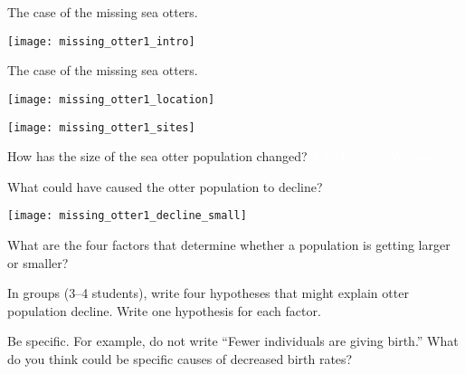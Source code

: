 \documentclass[t]{beamer}
\begin{document}
\begin{frame}{The case of the missing sea otters.}

	\centering\texttt{[image: missing\_otter1\_intro]}
	
\end{frame}
%
{
\begin{frame}[t]{The case of the missing sea otters.}

	\texttt{[image: missing\_otter1\_location]}
	
	
\end{frame}
}
%
\begin{frame}

	\centering\texttt{[image: missing\_otter1\_sites]}
	
\end{frame}
%
{
\begin{frame}[b]{How has the size of the sea otter population changed?}
	\hfill \tiny \textcolor{white}{J.J. Harrison, Wikimedia, }
\end{frame}
}
%
\begin{frame}[t]{What could have caused the otter population to decline?}

	\begin{multicols}{2}
	
	\texttt{[image: missing\_otter1\_decline\_small]}

	\columnbreak
	
	What are the four factors that determine whether 
	a population is getting larger or smaller?

	\vspace*{\baselineskip}

	In groups (3–4 students), write four hypotheses that might 
	explain otter population decline. Write one hypothesis
	for each factor. 

	\vspace*{\baselineskip}

	Be specific. For example, do not write “Fewer 
	individuals are giving birth.”  What do you think 
	could be specific causes of decreased birth rates?

	\end{multicols}
		
\end{frame}
\end{document}

